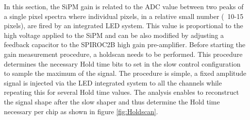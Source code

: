 In this section, the SiPM gain is related to the ADC value between two peaks of a single pixel spectra where individual pixels, in a relative small number (~10-15 pixels), are fired by an integrated LED system. This value is proportional to the high voltage applied to the SiPM and can be also modified by adjusting a feedback capacitor to the SPIROC2B high gain pre-amplifier. Before starting the gain measurement procedure, a holdscan needs to be performed. This procedure determines the necessary Hold time bits to set in the slow control configuration to sample the maximum of the signal. The procedure is simple, a fixed amplitude signal is injected via the LED integrated system to all the channels while repeating this for several Hold time values. The analysis enables to reconstruct the signal shape after the slow shaper and thus determine the Hold time necessary per chip as shown in figure \ref{fig:Holdscan}.

